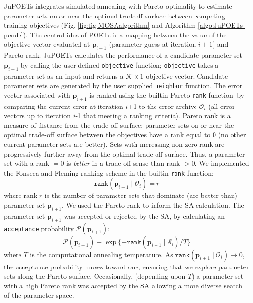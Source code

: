 \documentclass[12pt]{article}
\begin{document}
JuPOETs integrates simulated annealing with Pareto optimality to estimate parameter sets on or near the optimal tradeoff surface between competing training objectives
(Fig. \ref{fig:fig-MOSAalgorithm} and Algorithm \ref{algo:JuPOETs-pcode}).
The central idea of POETs is a mapping between the value of the objective vector evaluated at $\mathbf{p}_{i+1}$ (parameter guess at iteration $i+1$) and Pareto rank.
JuPOETs calculates the performance of a candidate parameter set $\mathbf{p}_{i+1}$ by calling the user defined \texttt{objective} function; \texttt{objective} takes
a parameter set as an input and returns a $\mathcal{K}\times{1}$ objective vector. Candidate parameter sets are generated by the user supplied \texttt{neighbor} function.
The error vector associated with $\mathbf{p}_{i+1}$ is ranked using the builtin Pareto \texttt{rank} function, by comparing the current error at iteration $i$+1 to the error archive $\mathcal{O}_{i}$ (all error vectors up to iteration $i$-1 that meeting a ranking criteria). Pareto rank is a measure of distance from the trade-off surface;
parameter sets on or near the optimal trade-off surface between the objectives have a rank equal to $0$ (no other current parameter sets are better).
Sets with increasing non-zero rank are progressively further away from the optimal trade-off surface.
Thus, a parameter set with a rank $=0$ is \emph{better} in a trade-off sense than rank $>0$.
We implemented the Fonseca and Fleming ranking scheme \cite{RANKING} in the builtin \texttt{rank} function:
\begin{equation}\label{eqn_rank}
\texttt{rank}\left(\mathbf{p}_{i+1}\mid \mathcal{O}_{i}\right)=r
\end{equation} where rank $r$ is the number of parameter sets that dominate (are better than) parameter set $\mathbf{p}_{i+1}$.
We used the Pareto rank to inform the SA calculation.
The parameter set $\mathbf{p}_{i+1}$ was accepted or rejected by the SA, by calculating an \texttt{acceptance} probability $\mathcal{P}\left(\mathbf{p}_{i+1}\right)$:
\begin{equation}\label{eqn_costMOSA}
\mathcal{P}(\mathbf{p}_{i+1}) \equiv \exp{\{-\texttt{rank}\left(\mathbf{p}_{i+1} \mid \mathcal{S}_{i} \right)/T\}}
\end{equation}
where $T$ is the computational annealing temperature.
As $\texttt{rank}\left(\mathbf{p}_{i+1}\mid \mathcal{O}_{i}\right)\rightarrow{0}$, the acceptance probability moves toward one,
ensuring that we explore parameter sets along the Pareto surface.
Occasionally, (depending upon $T$) a parameter set with a high Pareto rank was accepted by the SA allowing a more diverse search of the parameter space.
\end{document}
